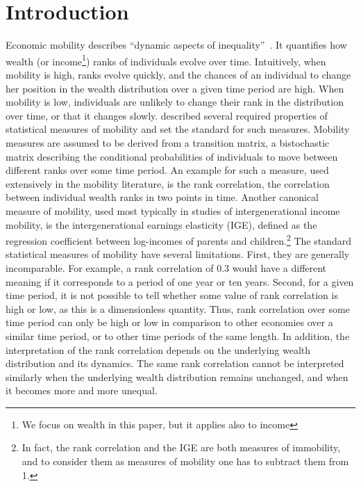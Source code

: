 \documentclass[11pt]{article}
\numberwithin{equation}{section}
\begin{document}
\section{Introduction}\label{sec:introduction}
Economic mobility describes ``dynamic aspects of inequality''~\citep{Shorrocks1978}. It quantifies how wealth (or income\footnote{We focus on wealth in this paper, but it applies also to income}) ranks of individuals evolve over time. Intuitively, when mobility is high, ranks evolve quickly, and the chances of an individual to change her position in the wealth distribution over a given time period are high. When mobility is low, individuals are unlikely to change their rank in the distribution over time, or that it changes slowly.
\citet{Shorrocks1978} described several required properties of statistical measures of mobility and set the standard for such measures. Mobility measures are assumed to be derived from a transition matrix, a bistochastic matrix describing the conditional probabilities of individuals to move between different ranks over some time period. An example for such a measure, used extensively in the mobility literature, is the rank correlation, the correlation between individual wealth ranks in two points in time. Another canonical measure of mobility, used most typically in studies of intergenerational income mobility, is the intergenerational earnings elasticity (IGE), defined as the regression coefficient between log-incomes of parents and children.\footnote{In fact, the rank correlation and the IGE are both measures of immobility, and to consider them as measures of mobility one has to subtract them from 1.}
The standard statistical measures of mobility have several limitations. First, they are generally incomparable. For example, a rank correlation of 0.3 would have a different meaning if it corresponds to a period of one year or ten years. Second, for a given time period, it is not possible to tell whether some value of rank correlation is high or low, as this is a dimensionless quantity. Thus, rank correlation over some time period can only be high or low in comparison to other economies over a similar time period, or to other time periods of the same length.
In addition, the interpretation of the rank correlation depends on the underlying wealth distribution and its dynamics. The same rank correlation cannot be interpreted similarly when the underlying wealth distribution remains unchanged, and when it becomes more and more unequal.
\end{document}
